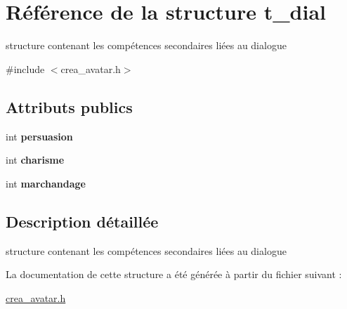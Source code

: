 \hypertarget{structt__dial}{\section{Référence de la structure t\-\_\-dial}
\label{structt__dial}
}


structure contenant les compétences secondaires liées au dialogue  




{\ttfamily \#include $<$crea\-\_\-avatar.\-h$>$}

\subsection*{Attributs publics}
\begin{DoxyCompactItemize}
\item 
\hypertarget{structt__dial_a019a195cbadf55821dc365d6a4165428}{int {\bfseries persuasion}}\label{structt__dial_a019a195cbadf55821dc365d6a4165428}

\item 
\hypertarget{structt__dial_a9999b9b11597ffaeb16fac67b0d32149}{int {\bfseries charisme}}\label{structt__dial_a9999b9b11597ffaeb16fac67b0d32149}

\item 
\hypertarget{structt__dial_a50c47e718a148eb129b087398ce67166}{int {\bfseries marchandage}}\label{structt__dial_a50c47e718a148eb129b087398ce67166}

\end{DoxyCompactItemize}


\subsection{Description détaillée}
structure contenant les compétences secondaires liées au dialogue 

La documentation de cette structure a été générée à partir du fichier suivant \-:\begin{DoxyCompactItemize}
\item 
\hyperlink{crea__avatar_8h}{crea\-\_\-avatar.\-h}\end{DoxyCompactItemize}
